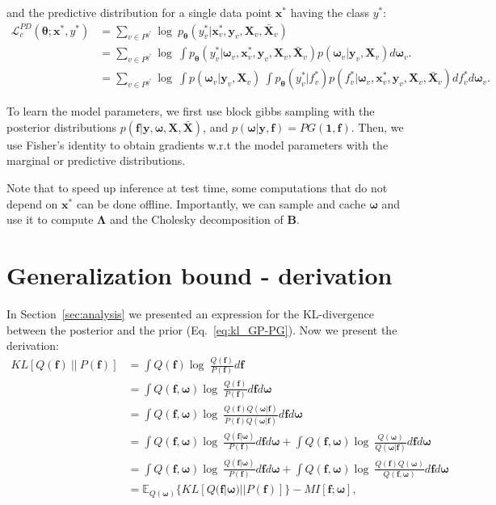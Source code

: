 \documentclass{article}
\def\Secref#1{Section~\ref{#1}}
\def\Eqref#1{Eq.~\ref{#1}}
\newcommand{\bld}[1]{\boldsymbol{#1}}
\def\rvf{{\mathbf{f}}}
\def\rvx{{\mathbf{x}}}
\def\rvy{{\mathbf{y}}}
\def\rmB{{\mathbf{B}}}
\def\rmX{{\mathbf{X}}}
\newcommand{\E}{\mathbb{E}}
\newcommand{\KL}{KL}
\newcommand{\rvomega}{\bld{\mathbf{\omega}}}
\newcommand{\rmLambda}{\mathbf{\Lambda}}
\newcommand{\NNP}{\mathbf{\theta}}
\newcommand{\rmXbar}{\bar{\mathbf{\mathbf{X}}}}
\begin{document}
and the predictive distribution for a single data point $\rvx^*$ having the class $y^*$:
\begin{equation}\label{eq:tree_objective_pl_appendix}
    \begin{aligned}
        \mathcal{L}^{PD}_c (\NNP ;\rvx^*,y^*) &= \sum_{v \in P^{y^*}} \log~p_{\NNP}( y_{v}^{*} | \rvx_{v}^{*}, \rvy_{v},  \rmX_{v}, \rmXbar_{v})\\
        &= \sum_{v \in P^{y^*}} \log~\int p_{\NNP}( y_{v}^{*} | \rvomega_{v}, \rvx_{v}^{*}, \rvy_{v}, \rmX_{v}, \rmXbar_{v}) p(\rvomega_{v} | \rvy_{v}, \rmX_{v}) d\rvomega_{v}.\\
        &= \sum_{v \in P^{y^*}} \log~\int p(\rvomega_{v} | \rvy_{v}, \rmX_{v})~\int p_{\NNP}( y_{v}^{*} | f_{v}^{*}) p(f_{v}^{*} | \rvomega_{v}, \rvx_{v}^{*}, \rvy_{v}, \rmX_{v}, \rmXbar_{v}) df_v^{*} d\rvomega_{v}.
    \end{aligned}
\end{equation}

To learn the model parameters, we first use block gibbs sampling with the posterior distributions $p(\rvf | \rvy, \rvomega, \rmX, \rmXbar)$, and $p(\rvomega | \rvy, \rvf) = PG(\bld{1}, \rvf)$. Then, we use Fisher's identity \cite{douc2014nonlinear} to obtain gradients w.r.t the model parameters with the marginal or predictive distributions.

Note that to speed up inference at test time, some computations that do not depend on $\rvx^*$ can be done offline. Importantly, we can sample and cache $\rvomega$ and use it to compute $\rmLambda$ and the Cholesky decomposition of $\rmB$.

\section{Generalization bound - derivation} \label{sec_app:generalization_bound}
In \Secref{sec:analysis} we presented an expression for the KL-divergence between the posterior and the prior (\Eqref{eq:kl_GP-PG}). Now we present the derivation:
\begin{equation}\label{eq:kl_GP-PG_dev}
\begin{aligned}
    \KL[Q(\rvf)~||~P(\rvf)] &= \int Q(\rvf)\log~\frac{Q(\rvf)}{P(\rvf)}d\rvf\\
    &= \int Q(\rvf, \rvomega) \log~\frac{Q(\rvf)}{P(\rvf)}d\rvf d\rvomega\\
    &= \int Q(\rvf, \rvomega) \log~\frac{Q(\rvf)Q(\rvomega|\rvf)}{P(\rvf)Q(\rvomega|\rvf)}d\rvf d\rvomega\\
    &= \int Q(\rvf, \rvomega) \log~\frac{Q(\rvf | \rvomega)}{P(\rvf)}d\rvf d\rvomega + \int Q(\rvf, \rvomega)\log~\frac{Q(\rvomega)}{Q(\rvomega | \rvf)}d\rvf d\rvomega\\
     &= \int Q(\rvf, \rvomega) \log~\frac{Q(\rvf | \rvomega)}{P(\rvf)}d\rvf d\rvomega + \int Q(\rvf, \rvomega)\log~\frac{Q(\rvf)Q(\rvomega)}{Q(\rvf, \rvomega)}d\rvf d\rvomega\\
    &= \E_{Q(\rvomega)}\{\KL[Q(\rvf | \rvomega) || P(\rvf)]\} - MI[\rvf;\rvomega],
\end{aligned}
\end{equation}
\end{document}
